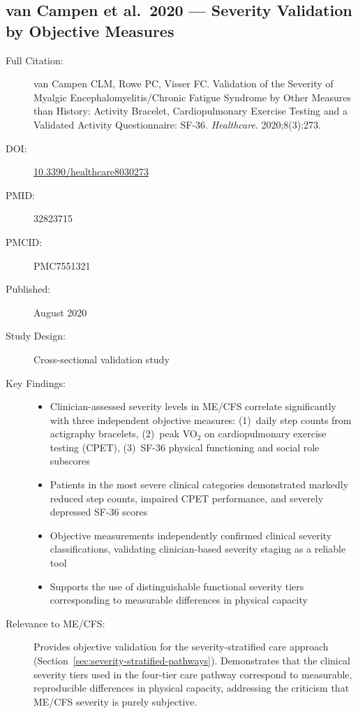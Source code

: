 \subsection{van Campen et al.\ 2020 --- Severity Validation by Objective Measures}

\begin{description}
    \item[Full Citation:] van Campen CLM, Rowe PC, Visser FC. Validation of the Severity of Myalgic Encephalomyelitis/Chronic Fatigue Syndrome by Other Measures than History: Activity Bracelet, Cardiopulmonary Exercise Testing and a Validated Activity Questionnaire: SF-36. \textit{Healthcare}. 2020;8(3):273.
    \item[DOI:] \href{https://doi.org/10.3390/healthcare8030273}{10.3390/healthcare8030273}
    \item[PMID:] 32823715
    \item[PMCID:] PMC7551321
    \item[Published:] August 2020
    \item[Study Design:] Cross-sectional validation study
    \item[Key Findings:]
    \begin{itemize}
        \item Clinician-assessed severity levels in ME/CFS correlate significantly with three independent objective measures: (1)~daily step counts from actigraphy bracelets, (2)~peak VO$_2$ on cardiopulmonary exercise testing (CPET), (3)~SF-36 physical functioning and social role subscores
        \item Patients in the most severe clinical categories demonstrated markedly reduced step counts, impaired CPET performance, and severely depressed SF-36 scores
        \item Objective measurements independently confirmed clinical severity classifications, validating clinician-based severity staging as a reliable tool
        \item Supports the use of distinguishable functional severity tiers corresponding to measurable differences in physical capacity
    \end{itemize}
    \item[Relevance to ME/CFS:] Provides objective validation for the severity-stratified care approach (Section~\ref{sec:severity-stratified-pathways}). Demonstrates that the clinical severity tiers used in the four-tier care pathway correspond to measurable, reproducible differences in physical capacity, addressing the criticism that ME/CFS severity is purely subjective.

\end{description}

